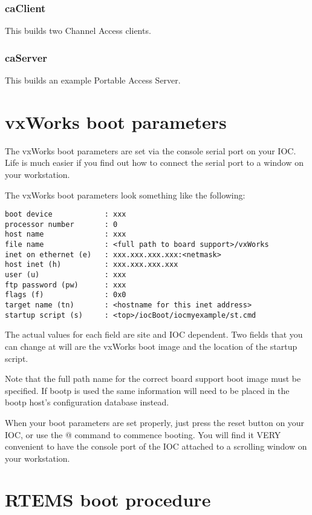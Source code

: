 \subsubsection{caClient}

This builds two Channel Access clients.

\subsubsection{caServer}

This builds an example Portable Access Server.

\section{vxWorks boot parameters}

The vxWorks boot parameters are set via the console serial port on your IOC. Life is much easier if you find out how to 
connect the serial port to a window on your workstation.

The vxWorks boot parameters look something like the following:

\begin{verbatim}
boot device            : xxx
processor number       : 0
host name              : xxx
file name              : <full path to board support>/vxWorks
inet on ethernet (e)   : xxx.xxx.xxx.xxx:<netmask>
host inet (h)          : xxx.xxx.xxx.xxx
user (u)               : xxx
ftp password (pw)      : xxx
flags (f)              : 0x0
target name (tn)       : <hostname for this inet address>
startup script (s)     : <top>/iocBoot/iocmyexample/st.cmd
\end{verbatim}
The actual values for each field are site and IOC dependent. Two fields that you can change at will are the vxWorks boot 
image and the location of the startup script.

Note that the full path name for the correct board support boot image must be specified. If bootp is used the same 
information will need to be placed in the bootp host's configuration database instead.

When your boot parameters are set properly, just press the reset button on your IOC, or use the @ command to commence 
booting. You will find it VERY convenient to have the console port of the IOC attached to a scrolling window on your 
workstation.

\section{RTEMS boot procedure}

